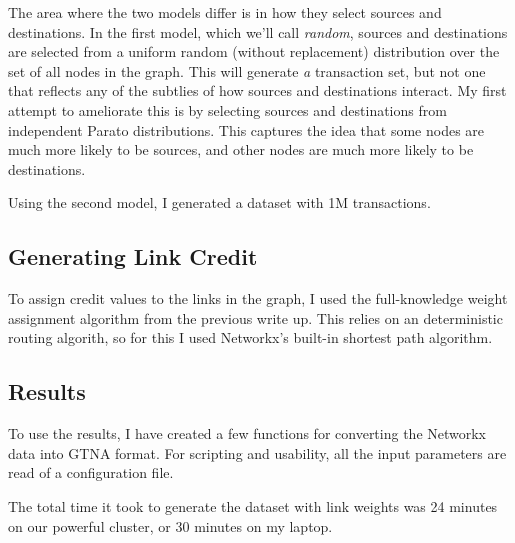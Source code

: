\documentclass{article}
\theoremstyle{definition}
\begin{document}
The area where the two models differ is in how they select sources and destinations. In the first model, which we'll call \emph{random}, sources and destinations are selected from a uniform random (without replacement) distribution over the set of all nodes in the graph. This will generate \emph{a} transaction set, but not one that reflects any of the subtlies of how sources and destinations interact. My first attempt to ameliorate this is by selecting sources and destinations from independent Parato distributions. This captures the idea that some nodes are much more likely to be sources, and other nodes are much more likely to be destinations.

Using the second model, I generated a dataset with 1M transactions.

\subsection*{Generating Link Credit}
To assign credit values to the links in the graph, I used the full-knowledge weight assignment algorithm from the previous write up. This relies on an deterministic routing algorith, so for this I used Networkx's built-in shortest path algorithm.

\subsection*{Results}
To use the results, I have created a few functions for converting the Networkx data into GTNA format. For scripting and usability, all the input parameters are read of a configuration file.

The total time it took to generate the dataset with link weights was 24 minutes on our powerful cluster, or 30 minutes on my laptop.




\end{document}
